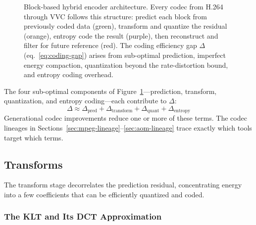 \begin{figure}[ht]
\caption{Block-based hybrid encoder architecture. Every codec from H.264
  through VVC follows this structure: predict each block from previously
  coded data (green), transform and quantize the residual (orange), entropy
  code the result (purple), then reconstruct and filter for future
  reference (red). The coding efficiency gap $\Delta$
  (eq.~\ref{eq:coding-gap}) arises from sub-optimal prediction, imperfect
  energy compaction, quantization beyond the rate-distortion bound, and
  entropy coding overhead.}
\label{fig:hybrid-encoder}
\end{figure}

The four sub-optimal components of Figure~\ref{fig:hybrid-encoder}---prediction,
transform, quantization, and entropy coding---each contribute to $\Delta$:
\begin{equation}
  \Delta \approx \Delta_{\text{pred}} + \Delta_{\text{transform}}
    + \Delta_{\text{quant}} + \Delta_{\text{entropy}}
  \label{eq:delta-decomp}
\end{equation}
Generational codec improvements reduce one or more of these terms. The codec
lineages in Sections~\ref{sec:mpeg-lineage}--\ref{sec:aom-lineage} trace
exactly which tools target which terms.

\subsection{Transforms}
\label{sec:transforms}

The transform stage decorrelates the prediction residual, concentrating
energy into a few coefficients that can be efficiently quantized and coded.

\subsubsection{The KLT and Its DCT Approximation}
\label{sec:klt-dct}

